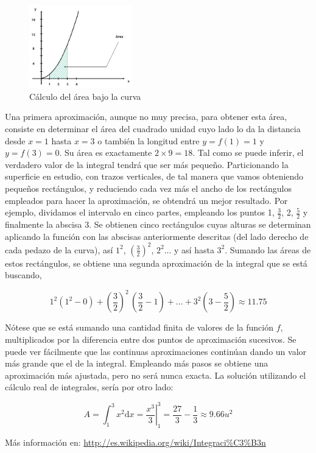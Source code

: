 \documentclass[12pt,letterpaper]{article}
\begin{document}
\begin{figure}[h] 
	\centering
	\includegraphics[width=0.4\textwidth]{img/area_bajo_la_curva.jpg}
	\caption{Cálculo del área bajo la curva}
	\label{fig:tres}
\end{figure}

Una primera aproximación, aunque no muy precisa, para obtener esta área, consiste en determinar el área del cuadrado unidad cuyo lado lo da la distancia desde $x=1$ hasta $x=3$ o también la longitud entre $y=f(1)=1$ y $y=f(3)=0$. Su área es exactamente $2 \times 9 = 18$. Tal como se puede inferir, el verdadero valor de la integral tendrá que ser más pequeño. Particionando la superficie en estudio, con trazos verticales, de tal manera que vamos obteniendo pequeños rectángulos, y reduciendo cada vez más el ancho de los rectángulos empleados para hacer la aproximación, se obtendrá un mejor resultado. Por ejemplo, dividamos el intervalo en cinco partes, empleando los puntos 1, $\frac{3}{2}$, 2, $\frac{5}{2}$ y finalmente la abscisa 3. Se obtienen cinco rectángulos cuyas alturas se determinan aplicando la función con las abscisas anteriormente descritas (del lado derecho de cada pedazo de la curva), así $1^2$, $(\frac{3}{2})^2$, $2^2$... y así hasta $3^2$. Sumando las áreas de estos rectángulos, se obtiene una segunda aproximación de la integral que se está buscando,

\[
 1^2(1^2 - 0)+ \left(\frac{3}{2}\right)^2\,\left(\frac{3}{2}- 1\right)+ \dots + 3^2\left(3-\frac{5}{2}\right) \approx 11.75
\]

Nótese que se está sumando una cantidad finita de valores de la función $f$, multiplicados por la diferencia entre dos puntos de aproximación sucesivos. Se puede ver fácilmente que las continuas aproximaciones continúan dando un valor más grande que el de la integral. Empleando más pasos se obtiene una aproximación más ajustada, pero no será nunca exacta. La solución utilizando el cálculo real de integrales, sería por otro lado:

\begin{displaymath}
	A = \int_{1}^{3} x^2 \mathrm{d}x = \left.\frac{x^3}{3}\right |_1^3 = \frac{27}{3} - \frac{1}{3} \approx 9.66 u^2
\end{displaymath}



Más información en: \url{http://es.wikipedia.org/wiki/Integraci\%C3\%B3n}
\end{document}
